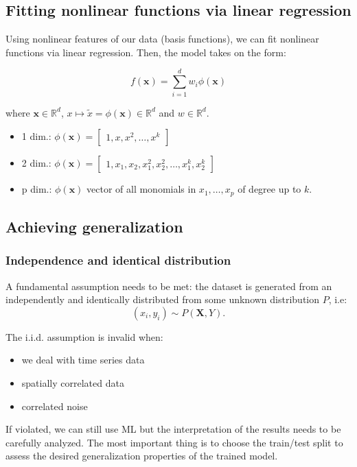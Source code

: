 \documentclass[a4paper,10pt,twoside]{article}
\begin{document}
\subsection{Fitting nonlinear functions via linear regression}

Using nonlinear features of our data (basis functions), we can fit nonlinear functions via linear regression. Then, the model takes on the form:

\begin{equation}
    f(\mathbf{x}) = \sum_{i=1}^{d}w_i\phi(\mathbf{x})
\end{equation}

where $\mathbf{x}\in\mathbb{R}^d$, $x\mapsto \tilde{x}=\phi(\mathbf{x})\in\mathbb{R}^d$ and $w\in\mathbb{R}^d$.
\begin{itemize}
    \item 1 dim.: $\phi(\mathbf{x})=\begin{bmatrix}
        1,x, x^2, \ldots, x^k
    \end{bmatrix}$
    \item 2 dim.: $\phi(\mathbf{x})=\begin{bmatrix}
        1,x_1, x_2, x_1^2, x_2^2, \ldots, x_1^k, x_2^k
    \end{bmatrix}$
    \item p dim.: $\phi(\mathbf{x})$ vector of all monomials in $x_1,\ldots, x_p$ of degree up to $k$.
\end{itemize}

\subsection{Achieving generalization}
\subsubsection{Independence and identical distribution}
A fundamental assumption needs to be met: the dataset is generated from an independently and identically distributed from some unknown distribution $P$, i.e:
\begin{equation*}
    (x_i, y_i)\sim P(\mathbf{X},Y).
\end{equation*}

The i.i.d. assumption is invalid when:
\begin{itemize}
    \item we deal with time series data
    \item spatially correlated data
    \item correlated noise
\end{itemize}
If violated, we can still use ML but the interpretation of the results needs to be carefully analyzed. The most important thing is to choose the train/test split to assess the desired generalization properties of the trained model.
\end{document}
